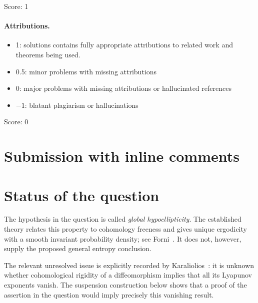 \documentclass[11pt]{article}
\theoremstyle{definition}
\theoremstyle{remark}
\begin{document}
\noindent Score: 1

\paragraph{Attributions.}
\begin{itemize}
	\item  1: solutions contains fully appropriate attributions
		to related work and theorems being used.
	\item  0.5: minor problems with missing attributions
	\item  0: major problems with missing attributions or hallucinated
		 references
	\item  $-1$: blatant plagiarism or hallucinations
\end{itemize}

\noindent Score: 0

\newpage
\section{Submission with inline comments}


\begin{abstract}
A complete proof of the proposed assertion is not known in the stated
generality. In fact, the assertion would settle the open problem of
vanishing Lyapunov exponents for cohomologically rigid diffeomorphisms.
We give a complete proof of this reduction, explaining why the usual
structural results about globally hypoelliptic vector fields do not
supply the requested conclusion.
\end{abstract}

\section{Status of the question}

The hypothesis in the question is called \emph{global hypoellipticity}.
The established theory relates this property to cohomology freeness and
gives unique ergodicity with a smooth invariant probability density;
see Forni~\cite[Proposition~2.4 and Theorem~3.10]{Forni}.
It does not, however, supply the proposed general entropy conclusion.

The relevant unresolved issue is explicitly recorded by
Karaliolios~\cite[Introduction, p.~6]{Karaliolios}: it is unknown whether
cohomological rigidity of a diffeomorphism implies that all its Lyapunov
exponents vanish. The suspension construction below shows that a proof
of the assertion in the question would imply precisely this vanishing
result.
\end{document}
